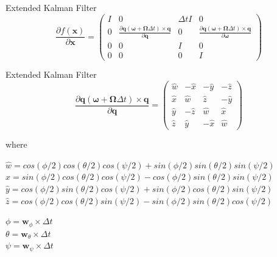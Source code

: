 \documentclass{beamer}
\begin{document}
	\begin{frame}{Extended Kalman Filter}
		\[
		\frac{\partial f(\mathbf{x}) }{ \partial \mathbf{x} } = \left(
		\begin{array}{cccc}
			I & 0 & \Delta t I & 0 \\
			0 & \frac{ \partial \mathbf{q}(\mathbf{\omega}+\mathbf{\Omega}\Delta t) \times \mathbf{q} }{ \partial \mathbf{q} }
			& 0 & \frac{ \partial \mathbf{q}(\mathbf{\omega}+\mathbf{\Omega}\Delta t) \times \mathbf{q} }{ \partial \mathbf{\omega} } \\
			0 & 0 & I & 0 \\
			0 & 0 & 0 & I 
		\end{array}
		\right)
		\]
	\end{frame}

	\begin{frame}{Extended Kalman Filter}
		\[
			\frac{ \partial \mathbf{q}(\mathbf{\omega}+\mathbf{\Omega}\Delta t) \times \mathbf{q} }{ \partial \mathbf{q} } = 
			\left(
			\begin{array}{cccc}
				\hat{w} & -\hat{x} & -\hat{y} & -\hat{z} \\
				\hat{x} & \hat{w} & \hat{z} & -\hat{y} \\
				\hat{y} & -\hat{z} & \hat{w} & \hat{x} \\
				\hat{z} & \hat{y} & -\hat{x} & \hat{w} 
			\end{array}
			\right)
		\]

		where

		$\hat{w} = cos(\phi/2)cos(\theta/2)cos(\psi/2) + sin(\phi/2)sin(\theta/2)sin(\psi/2)$
		$\hat{x} = sin(\phi/2)cos(\theta/2)cos(\psi/2) - cos(\phi/2)sin(\theta/2)sin(\psi/2)$
		$\hat{y} = cos(\phi/2)sin(\theta/2)cos(\psi/2) + sin(\phi/2)cos(\theta/2)sin(\psi/2)$
		$\hat{z} = cos(\phi/2)cos(\theta/2)sin(\psi/2) - sin(\phi/2)sin(\theta/2)cos(\psi/2)$
		
		$\phi = \mathbf{w}_{\phi} \times \Delta t$ \\
		$\theta = \mathbf{w}_{\theta} \times \Delta t$ \\
		$\psi = \mathbf{w}_{\psi} \times \Delta t$ \\
	\end{frame}
\end{document}
